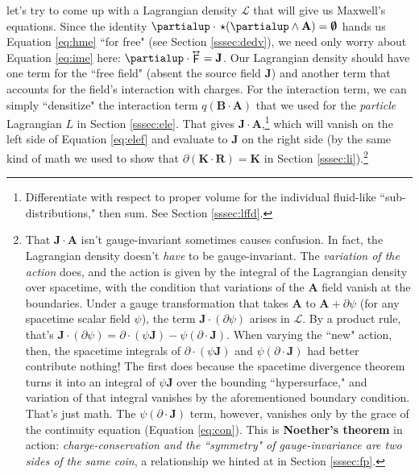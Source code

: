 \documentclass[12pt]{article}
\renewcommand{\vv}[1]{\mathbf{#1}}
\newcommand{\tightoverset}[2]{%
  \mathop{#2}\limits^{\vbox to -.5ex{\kern-0.75ex\hbox{$#1$}\vss}}}
\newcommand{\inlinedy}[1]{\tightoverset{\text{\tiny$\bm\leftrightarrow$}}{#1}}
\begin{document}
let's try to come up with a Lagrangian density $\mathcal{L}$ that will give us Maxwell's equations. Since the identity $\partialup \cdot \, \star ( \partialup \wedge \vv A ) = \textrm{\mbox{\boldmath $\emptyset$}}$ hands us Equation \ref{eq:hme} ``for free" (see Section \ref{sssec:dedv}), we need only worry about Equation \ref{eq:ime} here: $\partialup \cdot \inlinedy{\mathsf{F}} = \vv J$. Our Lagrangian density should have one term for the ``free field" (absent the source field $\vv J$) and another term that accounts for the field's interaction with charges. For the interaction term, we can simply ``densitize" the interaction term $q (\vv B \cdot \vv A)$ that we used for the \emph{particle} Lagrangian $L$ in Section \ref{sssec:ele}. That gives $\vv J \cdot \vv A$,\footnote{Differentiate with respect to proper volume for the individual fluid-like ``sub-distributions," then sum. See Section \ref{sssec:lffd}.} which will vanish on the left side of Equation \ref{eq:elef} and evaluate to $\vv J$ on the right side (by the same kind of math we used to show that $\partialup ( \vv K \cdot \vv R ) = \vv K$ in Section \ref{sssec:li}).\footnote{That $\vv J \cdot \vv A$ isn't gauge-invariant sometimes causes confusion. In fact, the Lagrangian density doesn't \emph{have} to be gauge-invariant. The \emph{variation of the action} does, and the action is given by the integral of the Lagrangian density over spacetime, with the condition that variations of the $\vv A$ field vanish at the boundaries. Under a gauge transformation that takes $\vv A$ to $\vv A + \partialup \psi$ (for any spacetime scalar field $\psi$), the term $\vv J \cdot ( \partialup \psi )$ arises in $\mathcal{L}$. By a product rule, that's $\vv J \cdot ( \partialup \psi ) = \partialup \cdot (\psi \vv J) - \psi  ( \partialup \cdot \vv J )$. When varying the ``new" action, then, the spacetime integrals of $\partialup \cdot (\psi \vv J)$ and $\psi ( \partialup \cdot \vv J )$ had better contribute nothing! The first does because the spacetime divergence theorem turns it into an integral of $\psi \vv J$ over the bounding ``hypersurface," and variation of that integral vanishes by the aforementioned boundary condition. That's just math. The $\psi ( \partialup \cdot \vv J )$ term, however, vanishes only by the grace of the continuity equation (Equation \ref{eq:con}). This is \textbf{Noether's theorem} in action: \emph{charge-conservation and the ``symmetry" of gauge-invariance are two sides of the same coin}, a relationship we hinted at in Section \ref{sssec:fp}.}
\end{document}
